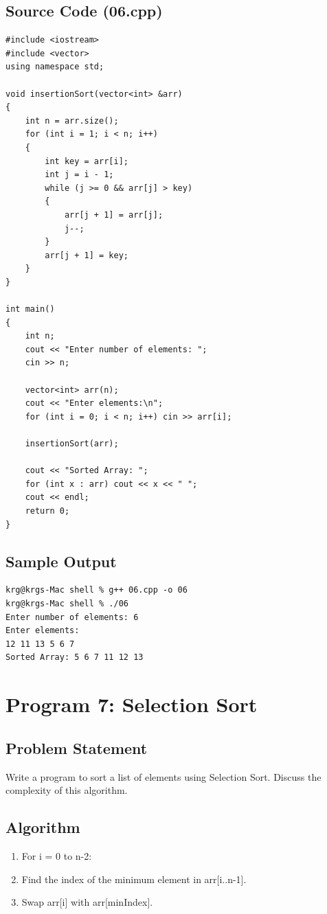 \documentclass[a4paper,12pt]{article}
\begin{document}
\subsection*{Source Code (06.cpp)}
\begin{lstlisting}[style=cppstyle]
#include <iostream>
#include <vector>
using namespace std;

void insertionSort(vector<int> &arr)
{
    int n = arr.size();
    for (int i = 1; i < n; i++)
    {
        int key = arr[i];
        int j = i - 1;
        while (j >= 0 && arr[j] > key)
        {
            arr[j + 1] = arr[j];
            j--;
        }
        arr[j + 1] = key;
    }
}

int main()
{
    int n;
    cout << "Enter number of elements: ";
    cin >> n;

    vector<int> arr(n);
    cout << "Enter elements:\n";
    for (int i = 0; i < n; i++) cin >> arr[i];

    insertionSort(arr);

    cout << "Sorted Array: ";
    for (int x : arr) cout << x << " ";
    cout << endl;
    return 0;
}
\end{lstlisting}

\subsection*{Sample Output}
\begin{lstlisting}[style=outputstyle]
krg@krgs-Mac shell % g++ 06.cpp -o 06
krg@krgs-Mac shell % ./06
Enter number of elements: 6
Enter elements:
12 11 13 5 6 7
Sorted Array: 5 6 7 11 12 13
\end{lstlisting}

\newpage

\section*{Program 7: Selection Sort}

\subsection*{Problem Statement}
Write a program to sort a list of elements using Selection Sort. Discuss the complexity of this algorithm.

\subsection*{Algorithm}
\begin{enumerate}
    \item For i = 0 to n-2:
    \item   Find the index of the minimum element in arr[i..n-1].
    \item   Swap arr[i] with arr[minIndex].
\end{enumerate}
\end{document}
